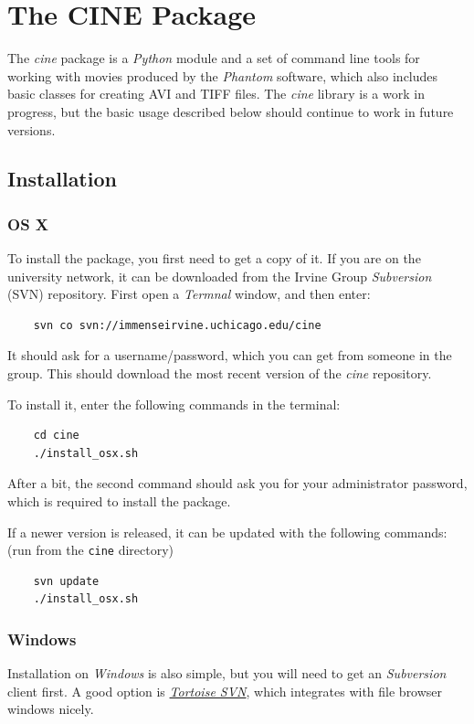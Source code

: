\documentclass[11pt]{amsart}
\begin{document}
\vfill \pagebreak
\section{The CINE Package}
The \emph{cine} package is a \emph{Python} module and a set of command line tools for working with movies produced by the \emph{Phantom} software, which also includes basic classes for creating AVI and TIFF files.
The \emph{cine} library is a work in progress, but the basic usage described below should continue to work in future versions.

\subsection{Installation}
\subsubsection{OS X}
To install the package, you first need to get a copy of it.
If you are on the university network, it can be downloaded from the Irvine Group \emph{Subversion} (SVN) repository.
First open a \emph{Termnal} window, and then enter:
\begin{verbatim}
    svn co svn://immenseirvine.uchicago.edu/cine
\end{verbatim}
It should ask for a username/password, which you can get from someone in the group.
This should download the most recent version of the \emph{cine} repository.

To install it, enter the following commands in the terminal:
\begin{verbatim}
    cd cine
    ./install_osx.sh
\end{verbatim}
After a bit, the second command should ask you for your administrator password, which is required to install the package.

If a newer version is released, it can be updated with the following commands: (run from the \texttt{cine} directory)
\begin{verbatim}
    svn update
    ./install_osx.sh  
\end{verbatim}

\subsubsection{Windows}
Installation on \emph{Windows} is also simple, but you will need to get an \emph{Subversion} client first.
A good option is \href{http://tortoisesvn.net/}{\emph{Tortoise SVN}}, which integrates with file browser windows nicely.
\end{document}

